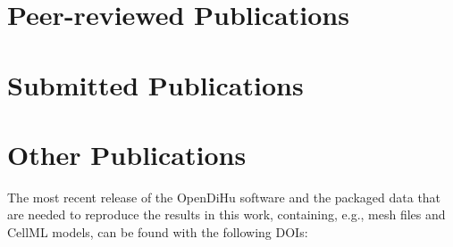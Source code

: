



\nocite{Bradley:2018:EDB}
\nocite{Maier2019}
\nocite{Maier2021}
\nocite{summerschool2019}
\nocite{maier_benjamin_2021_4705945}
\nocite{opendihu}
\nocite{MaierSubmitted}


\titlespacing*{\chapter}{0pt}{0pt}{40pt}


\titlespacing*{\chapter}{0pt}{50pt}{40pt}


\section*{\vspace{-5mm}Peer-reviewed Publications}
\vspace{-5mm}
\printbibliography[category=own,heading=none,title=]

\section*{\vspace{-5mm}Submitted Publications}
\vspace{-5mm}
\printbibliography[category=own_submitted,heading=none,title=]

\section*{\vspace{-5mm}Other Publications}
\vspace{-5mm}
The most recent release of the OpenDiHu software and the packaged data that are needed to reproduce the results in this work, containing, e.g., mesh files and CellML models, can be found with the following DOIs:

\printbibliography[category=own_other,heading=none,title=]

